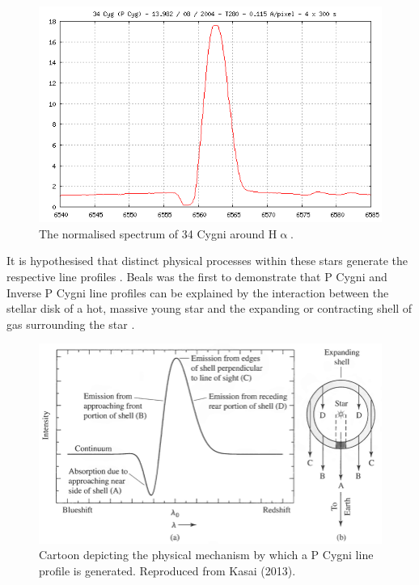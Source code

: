 \begin{figure}[!htb]
\centering
\includegraphics[scale=.40]{figures/34cygni.png}
\caption{The normalised spectrum of 34 Cygni around H$\upalpha$.}
\end{figure}

It is hypothesised that distinct physical processes within these stars generate the respective line profiles \cite{hou2016catalog}. Beals was the first to demonstrate that P Cygni and Inverse P Cygni line profiles can be explained by the interaction between the stellar disk of a hot, massive young star and the expanding or contracting shell of gas surrounding the star \cite{1953PDAO....9....1B}. 

\begin{figure}[!htb]
\centering
\includegraphics[scale=.40]{figures/expandingpcygni.png}
\caption{Cartoon depicting the physical mechanism by which a P Cygni line profile is generated. Reproduced from Kasai (2013)\cite{kasai2013type}.}
\end{figure}

